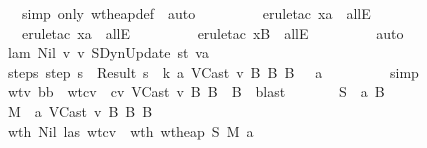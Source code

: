 \begin{isabellebody}
\ \ \ \ \ \ \ \ \isamarkupfalse \ {\isacharparenleft}simp\ only{\isacharcolon}\ wt{\isacharunderscore}heap{\isacharunderscore}def{\isacharparenright}\ \isamarkupfalse \ auto\isanewline
\ \ \ \ \ \ \ \ \isamarkupfalse \ {\isacharparenleft}erule{\isacharunderscore}tac\ x{\isacharequal}a\ \ allE{\isacharparenright}\isanewline
\ \ \ \ \ \ \ \ \isamarkupfalse \ {\isacharparenleft}erule{\isacharunderscore}tac\ x{\isacharequal}a\ \ allE{\isacharparenright}\isanewline
\ \ \ \ \ \ \ \ \isamarkupfalse \ {\isacharparenleft}erule{\isacharunderscore}tac\ x{\isacharequal}B{\isacharprime}\ \ allE{\isacharparenright}\isanewline
\ \ \ \ \ \ \ \ \isamarkupfalse \ auto\ \isamarkupfalse \isanewline
\ \ \ \ \ \ \isamarkupfalse \ lam\ Nil\ v{}\ v{}\ SDynUpdate\ st\ v{}a\isanewline
\ \ \ \ \ \ \isamarkupfalse \ steps{\isacharcolon}\ {\isachardoublequoteopen}step\ s\ {\isacharequal}\ Result\ {\isacharparenleft}s{\isacharprime}{\isacharcomma}\ {\isasymrho}{\isacharcomma}\ k{\isacharcomma}\ {\isacharparenleft}a{\isacharcomma}\ VCast\ v{}\ B\ B{\isacharprime}{\isacharcomma}\ B{\isacharprime}{\isacharparenright}\ {\isacharhash}\ {\isasymmu}{\isacharcomma}\ {\isacharbrackleft}a{\isacharbrackright}{\isacharparenright}{\isachardoublequoteclose}\isanewline
\ \ \ \ \ \ \ \ \isamarkupfalse \ simp\isanewline
\ \ \ \ \ \ \isamarkupfalse \ wtv{}\ bb\ \isamarkupfalse \ wtcv{}{\isacharcolon}\ {\isachardoublequoteopen}{\isasymSigma}\ {\isasymturnstile}cv\ VCast\ v{}\ B\ B{\isacharprime}\ {\isacharcolon}\ B{\isacharprime}{\isachardoublequoteclose}\ \isamarkupfalse \ blast\isanewline
\ \ \ \ \ \ \isamarkupfalse \ {\isacharquery}S{}\ {\isacharequal}\ {\isachardoublequoteopen}{\isacharparenleft}a{\isacharcomma}\ B{\isacharprime}{\isacharparenright}\ {\isacharhash}\ {\isasymSigma}{\isachardoublequoteclose}\isanewline
\ \ \ \ \ \ \isamarkupfalse \ {\isacharquery}M{}\ {\isacharequal}\ {\isachardoublequoteopen}{\isacharparenleft}a{\isacharcomma}\ VCast\ v{}\ B\ B{\isacharprime}{\isacharcomma}\ B{\isacharprime}{\isacharparenright}\ {\isacharhash}\ {\isasymmu}{\isachardoublequoteclose}\isanewline
\ \ \ \ \ \ \isamarkupfalse \ wt{\isacharunderscore}h\ Nil\ las\ wtcv{}\ \isamarkupfalse \ wt{\isacharunderscore}h{}{\isacharcolon}\ {\isachardoublequoteopen}wt{\isacharunderscore}heap\ {\isacharquery}S{}\ {\isacharquery}M{}\ {\isacharbraceleft}a{\isacharbraceright}{\isachardoublequoteclose}\isanewline

\end{isabellebody}
